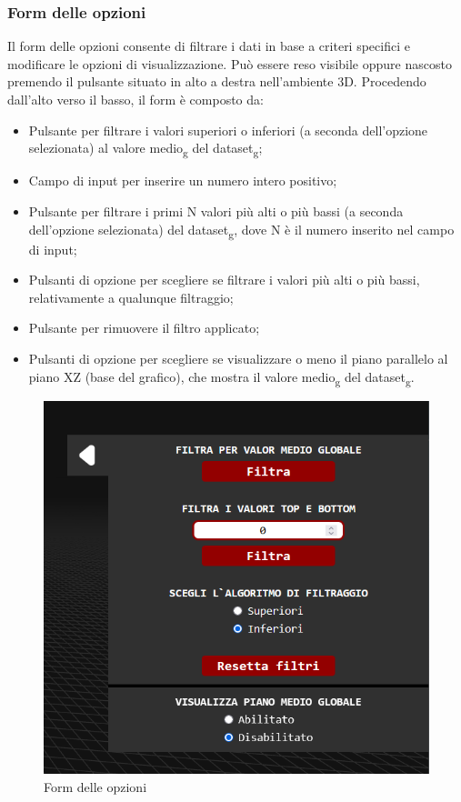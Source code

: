 \subsubsection{Form delle opzioni}
Il form delle opzioni consente di filtrare i dati in base a criteri specifici e
modificare le opzioni di visualizzazione. Può essere reso visibile oppure
nascosto premendo il pulsante situato in alto a destra nell'ambiente 3D.
Procedendo dall'alto verso il basso, il form è composto da:
\begin{itemize}
    \item Pulsante per filtrare i valori superiori o inferiori (a seconda dell'opzione
          selezionata) al valore medio\textsubscript{g} del dataset\textsubscript{g};
    \item Campo di input per inserire un numero intero positivo;
    \item Pulsante per filtrare i primi N valori più alti o più bassi (a seconda
          dell'opzione selezionata) del dataset\textsubscript{g}, dove N è il numero inserito nel campo di
          input;
    \item Pulsanti di opzione per scegliere se filtrare i valori più alti o più bassi,
          relativamente a qualunque filtraggio;
    \item Pulsante per rimuovere il filtro applicato;
    \item Pulsanti di opzione per scegliere se visualizzare o meno il piano parallelo al
          piano XZ (base del grafico), che mostra il valore medio\textsubscript{g} del dataset\textsubscript{g}.
\end{itemize}
\begin{figure}[ht!]
    \centering
    \includegraphics[scale=0.6]{template/images/options.png}
    \caption{Form delle opzioni}
\end{figure}

